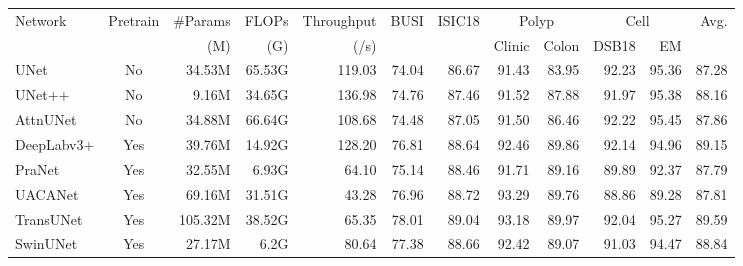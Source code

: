 \begin{table}[t]
\begin{center}
\begin{adjustbox}{width=0.88\textwidth}
\begin{tabular}{l|c|r|r|r|r|r|rr|rr|r}
\toprule
\multirow{2}{*}{Network} & \multirow{2}{*}{Pretrain} & \multirow{1}{*}{\#Params} & \multirow{1}{*}{FLOPs} & \multirow{1}{*}{Throughput} & \multirow{2}{*}{BUSI} &  \multirow{2}{*}{ISIC18} & \multicolumn{2}{c|}{Polyp} & \multicolumn{2}{c|}{Cell} & \multirow{2}{*}{Avg.}\\
\cline{8-11}
& & (M) & (G) & (/s) & & & Clinic & Colon & DSB18 & EM & \\
\midrule
UNet \cite{ronneberger2015u} & No & 34.53M & 65.53G & 119.03 & 74.04 & 86.67 & 91.43 & 83.95 & 92.23 & 95.36 & 87.28 \\
UNet++ \cite{zhou2018unet++} & No & 9.16M & 34.65G & 136.98 & 74.76 & 87.46 & 91.52 & 87.88 & 91.97 & 95.38 & 88.16 \\
AttnUNet \cite{oktay2018attention} & No & 34.88M & 66.64G & 108.68 & 74.48 & 87.05 & 91.50 & 86.46 & 92.22 & 95.45 & 87.86 \\
DeepLabv3+ \cite{chen2017deeplab} & Yes & 39.76M & 14.92G & 128.20 & 76.81 & 88.64 & 92.46 & 89.86 & 92.14 & 94.96 & 89.15 \\
PraNet \cite{fan2020pranet} & Yes & 32.55M & 6.93G & 64.10 & 75.14 & 88.46 & 91.71 & 89.16 & 89.89 & 92.37 & 87.79 \\
UACANet \cite{kim2021uacanet} & Yes & 69.16M & 31.51G & 43.28 & 76.96 & 88.72 & 93.29 & 89.76 & 88.86 & 89.28 & 87.81 \\
TransUNet \cite{chen2021transunet} & Yes & 105.32M & 38.52G & 65.35 & 78.01 & 89.04 & 93.18  & 89.97 & 92.04 & 95.27 & 89.59 \\
SwinUNet \cite{cao2021swin} & Yes & 27.17M  & 6.2G & 80.64 & 77.38 & 88.66 & 92.42 & 89.07 & 91.03 & 94.47 & 88.84 \\

\end{tabular}
\end{adjustbox}
\end{center}
\end{table}

